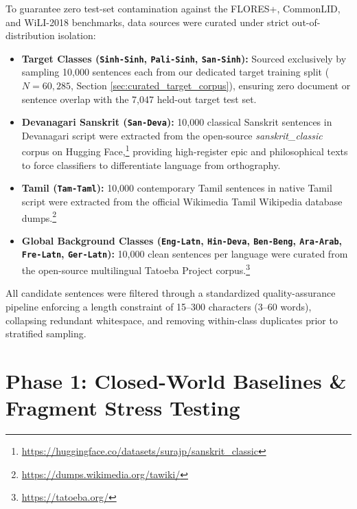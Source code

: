 \documentclass[11pt]{article}
\begin{document}
To guarantee zero test-set contamination against the FLORES+, CommonLID, and WiLI-2018 benchmarks, data sources were curated under strict out-of-distribution isolation:
\begin{itemize}
    \item \textbf{Target Classes (\texttt{Sinh-Sinh}, \texttt{Pali-Sinh}, \texttt{San-Sinh}):} Sourced exclusively by sampling 10,000 sentences each from our dedicated target training split ($N=60,285$, Section \ref{sec:curated_target_corpus}), ensuring zero document or sentence overlap with the 7,047 held-out target test set.
    \item \textbf{Devanagari Sanskrit (\texttt{San-Deva}):} 10,000 classical Sanskrit sentences in Devanagari script were extracted from the open-source \textit{sanskrit\_classic} corpus on Hugging Face,\footnote{\url{https://huggingface.co/datasets/surajp/sanskrit_classic}} providing high-register epic and philosophical texts to force classifiers to differentiate language from orthography.
    \item \textbf{Tamil (\texttt{Tam-Taml}):} 10,000 contemporary Tamil sentences in native Tamil script were extracted from the official Wikimedia Tamil Wikipedia database dumps.\footnote{\url{https://dumps.wikimedia.org/tawiki/}}
    \item \textbf{Global Background Classes (\texttt{Eng-Latn}, \texttt{Hin-Deva}, \texttt{Ben-Beng}, \texttt{Ara-Arab}, \texttt{Fre-Latn}, \texttt{Ger-Latn}):} 10,000 clean sentences per language were curated from the open-source multilingual Tatoeba Project corpus.\footnote{\url{https://tatoeba.org/}}
\end{itemize}
All candidate sentences were filtered through a standardized quality-assurance pipeline enforcing a length constraint of 15--300 characters (3--60 words), collapsing redundant whitespace, and removing within-class duplicates prior to stratified sampling.

\section{Phase 1: Closed-World Baselines \& Fragment Stress Testing}
\end{document}

